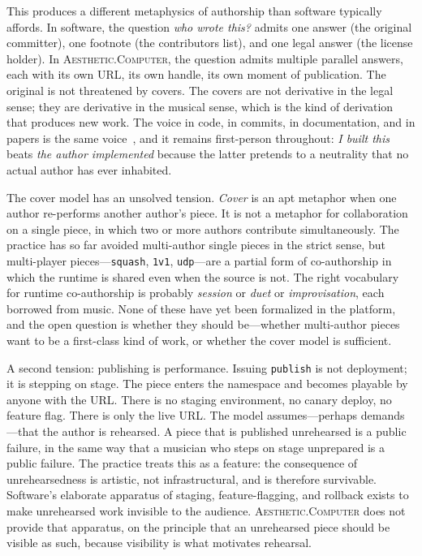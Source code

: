 \documentclass[10pt,letterpaper,twocolumn]{article}
\newcommand{\ac}{\textsc{Aesthetic.Computer}}
\begin{document}
This produces a different metaphysics of authorship than software typically affords. In software, the question \emph{who wrote this?} admits one answer (the original committer), one footnote (the contributors list), and one legal answer (the license holder). In \ac{}, the question admits multiple parallel answers, each with its own URL, its own handle, its own moment of publication. The original is not threatened by covers. The covers are not derivative in the legal sense; they are derivative in the musical sense, which is the kind of derivation that produces new work. The voice in code, in commits, in documentation, and in papers is the same voice~\citep{scudder2026voice}, and it remains first-person throughout: \emph{I built this} beats \emph{the author implemented} because the latter pretends to a neutrality that no actual author has ever inhabited.

The cover model has an unsolved tension. \emph{Cover} is an apt metaphor when one author re-performs another author's piece. It is not a metaphor for collaboration on a single piece, in which two or more authors contribute simultaneously. The practice has so far avoided multi-author single pieces in the strict sense, but multi-player pieces---\texttt{squash}, \texttt{1v1}, \texttt{udp}---are a partial form of co-authorship in which the runtime is shared even when the source is not. The right vocabulary for runtime co-authorship is probably \emph{session} or \emph{duet} or \emph{improvisation}, each borrowed from music. None of these have yet been formalized in the platform, and the open question is whether they should be---whether multi-author pieces want to be a first-class kind of work, or whether the cover model is sufficient.

A second tension: publishing is performance. Issuing \texttt{publish} is not deployment; it is stepping on stage. The piece enters the namespace and becomes playable by anyone with the URL. There is no staging environment, no canary deploy, no feature flag. There is only the live URL. The model assumes---perhaps demands---that the author is rehearsed. A piece that is published unrehearsed is a public failure, in the same way that a musician who steps on stage unprepared is a public failure. The practice treats this as a feature: the consequence of unrehearsedness is artistic, not infrastructural, and is therefore survivable. Software's elaborate apparatus of staging, feature-flagging, and rollback exists to make unrehearsed work invisible to the audience. \ac{} does not provide that apparatus, on the principle that an unrehearsed piece should be visible as such, because visibility is what motivates rehearsal.
\end{document}
